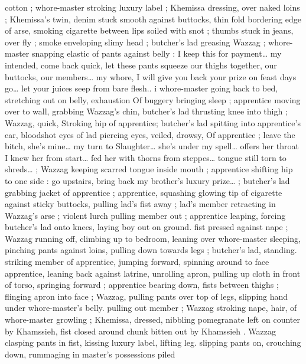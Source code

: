 cotton ; whore-master stroking luxury label ; Khemissa dressing, over 
naked loins ; Khemissa's twin, denim stuck smooth against buttocks, 
thin fold bordering edge of arse, smoking cigarette between lips 
soiled with snot ; thumbs stuck in jeans, over fly ; smoke enveloping 
slimy head ; butcher's lad greasing Wazzag ; whore-master snapping 
elastic of pants against belly : {\gl}{\td} I keep this for payment{\ldots} my 
intended, come back quick, let these pants squeeze our thighs 
together, our buttocks, our members{\ldots} my whore, I will give you back 
your prize on feast days{\td} go{\ldots} let your juices seep from bare flesh..{\gr} 
i whore-master going back to bed, stretching out on belly, exhaustion 
Of buggery bringing sleep ; apprentice moving over to wall, grabbing 
Wazzag's chin, butcher's lad thrusting knee into thigh ; Wazzag, 
quick, Stroking hip of apprentice; butcher's lad spitting into 
apprentice's ear, bloodshot eyes of lad piercing eyes, veiled, drowsy, 
Of apprentice ; {\gl}{\td} leave the bitch, she's mine{\ldots} my turn to 
Slaughter{\ldots} she's under my spell{\ldots} offers her throat{\td} I knew her from 
start{\ldots} fed her with thorns from steppes{\ldots} tongue still torn to 
shreds{\ldots}{\gr} ; Wazzag keeping scarred tongue inside mouth ; 
apprentice shifting hip to one side : {\gl} go upstairs, bring back my 
brother's luxury prize{\ldots}{\gr} ; butcher's lad grabbing jacket of 
apprentice ; apprentice, squashing glowing tip of cigarette against 
sticky buttocks, pulling lad's fist away ; lad's member retracting in 
Wazzag's arse ; violent lurch pulling member out ; apprentice 
leaping, forcing butcher's lad onto knees, laying boy out on ground. 
fist pressed against nape ; Wazzag running off, climbing up to 
bedroom, leaning over whore-master sleeping, pinching pants 
against loins, pulling down towards legs ; butcher's lad, standing. 
striking member of apprentice, jumping forward, spinning around to 
face apprentice, leaning back against latrine, unrolling apron, pulling 
up cloth in front of torso, springing forward ; apprentice bearing 
down, fists between thighs ; flinging apron into face ; Wazzag, pulling 
pants over top of legs, slipping hand under whore-master's belly. 
pulling out member ; Wazzag stroking nape, hair, of whore-master 
growling ; Khemissa, dressed, nibbling pomegranate left on counter 
by Khamssieh, fist closed around chunk bitten out by Khamssieh . 
Wazzag clasping pants in fist, kissing luxury label, lifting leg. slipping 
pants on, crouching down, rummaging in master's possessions piled 
